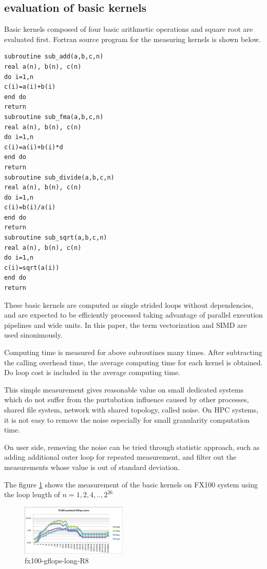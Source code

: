 \documentclass[conference]{IEEEtran}
\begin{document}
\begin{table}[b]
\end{table}


\subsection{evaluation of basic kernels}

Basic kernels composed of four basic arithmetic operations and square root
are evaluated first.
Fortran source program for the measuring kernels is shown below.

\begin{lstlisting}[caption={basic kernels}]
subroutine sub_add(a,b,c,n)
real a(n), b(n), c(n)  
do i=1,n
c(i)=a(i)+b(i)
end do
return
subroutine sub_fma(a,b,c,n)
real a(n), b(n), c(n)  
do i=1,n
c(i)=a(i)+b(i)*d
end do
return
subroutine sub_divide(a,b,c,n)
real a(n), b(n), c(n)  
do i=1,n
c(i)=b(i)/a(i)
end do
return
subroutine sub_sqrt(a,b,c,n)
real a(n), b(n), c(n)  
do i=1,n
c(i)=sqrt(a(i))
end do
return
\end{lstlisting}


These basic kernels are computed as single strided loops without dependencies,
and are expected to be efficiently processed taking advantage of parallel
execution pipelines and wide units.
In this paper, the term vectorization and SIMD are used sinonimously.

Computing time is measured for above subroutines many times.
After subtracting the calling overhead time,
the average computing time for each kernel is obtained.
Do loop cost is included in the average computing time.

This simple measurement gives reasonable value on small dedicated systems
which do not suffer from the purtubation influence caused by
other processes, shared file system, network with shared topology,
called noise.
On HPC systems, it is not easy to remove the noise
especially for small granularity computation time.

On user side, removing the noise can be tried through statistic approach,
such as
adding additional outer loop for repeated measurement, and filter out
the measurements whose value is out of standard deviation.


The figure \ref{fig:fx100-gflops-long-R8} shows the 
measurement of the basic kernels on FX100 system using the loop length of
\begin{math}
n=1,2,4,..,2^{26}
\end{math}

\begin{figure}[bt]
\centering
\includegraphics[width=0.45\textwidth]{figs/fx100-gflops-long-R8.pdf}
\caption{fx100-gflops-long-R8}
\label{fig:fx100-gflops-long-R8}
\end{figure}
\end{document}
